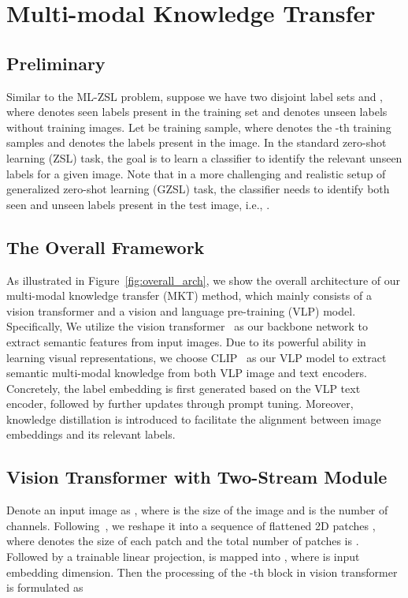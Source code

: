\documentclass[letterpaper]{article} \usepackage{aaai23}  \usepackage{times}  \usepackage{helvet}  \usepackage{courier}  \usepackage[hyphens]{url}  \usepackage{graphicx} \urlstyle{rm} \def\UrlFont{\rm}  \usepackage{natbib}  \usepackage{caption} \frenchspacing  \setlength{\pdfpagewidth}{8.5in}  \setlength{\pdfpageheight}{11in}
\begin{document}
\section{Multi-modal Knowledge Transfer}

\subsection{Preliminary}
Similar to the ML-ZSL problem, suppose we have two disjoint label sets  and , where  denotes seen labels present in the training set and  denotes unseen labels without training images. 
Let  be  training sample, where  denotes the -th training samples and  denotes the labels present in the image.
In the standard zero-shot learning (ZSL) task, the goal is to learn a classifier  to identify the relevant unseen labels for a given image. 
Note that in a more challenging and realistic setup of generalized zero-shot learning (GZSL) task, the classifier needs to identify both seen and unseen labels present in the test image, i.e., . \par

\subsection{The Overall Framework}
As illustrated in Figure~\ref{fig:overall_arch}, we show the overall architecture of our multi-modal knowledge transfer (MKT) method, which mainly consists of a vision transformer and a vision and language pre-training (VLP) model. 
Specifically,
We utilize the vision transformer~\cite{vit} as our  backbone network to extract semantic features from input images.
Due to its powerful ability in learning visual representations,
we choose CLIP~\cite{clip} as our VLP model to extract semantic multi-modal knowledge from both VLP image and text encoders.
Concretely, the label embedding is first generated based on the VLP text encoder, followed by further updates through prompt tuning.
Moreover, knowledge distillation is introduced to facilitate the alignment between image embeddings and its relevant labels.
\subsection{Vision Transformer with Two-Stream Module}
Denote an input image as , where  is the size of the image and  is the number of channels. 
Following~\cite{vit}, we reshape it into a sequence of flattened 2D patches , where  denotes the size of each patch and the total number of patches is .
Followed by a trainable linear projection,  is mapped into , where  is input embedding dimension.
Then the processing of the -th block in vision transformer is formulated as
\end{document}
